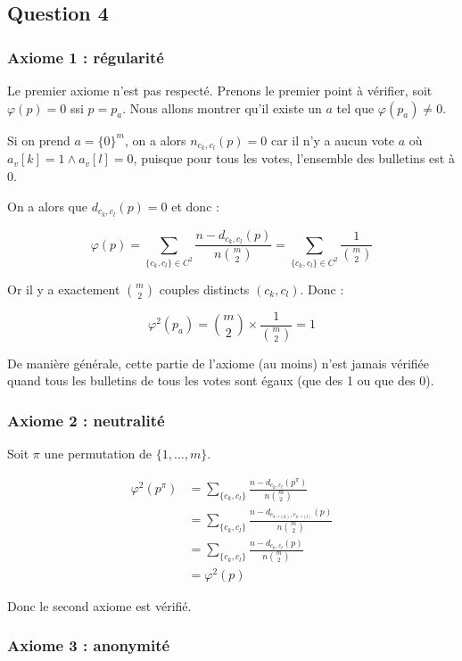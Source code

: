 \documentclass[11pt]{article}
\begin{document}
\subsection{Question 4}
 
\subsubsection{Axiome 1 : régularité}

Le premier axiome n'est pas respecté. Prenons le premier point à vérifier, soit $\varphi(p) = 0$ ssi $p = p_a$. Nous allons montrer qu'il existe un $a$ tel que $\varphi(p_a) \neq 0$.

Si on prend $a = \{0\}^m$, on a alors $n_{c_k,c_l}(p) = 0$ car il n'y a aucun vote $a$ où $a_v[k] = 1 \land a_v[l]=0$, puisque pour tous les votes, l'ensemble des bulletins est à $0$.

On a alors que $d_{c_k,c_l}(p) = 0$ et donc :

\[
\varphi(p) = \sum_{\{c_k,c_l\} \in C^2} 
\frac{n - d_{c_k,c_l}(p)}{n \binom{m}{2}} 
= \sum_{\{c_k,c_l\} \in C^2} \frac{1}{\binom{m}{2}} 
\]

Or il y a exactement $\binom{m}{2}$ couples distincts $({c_k,c_l})$. Donc : 

\[
\varphi^2(p_a) = \binom m2 \times \frac {1}{\binom m2} = 1
\]

De manière générale, cette partie de l'axiome (au moins) n'est jamais vérifiée quand tous les bulletins de tous les votes sont égaux (que des 1 ou que des 0).


\subsubsection{Axiome 2 : neutralité}

Soit $\pi$ une permutation de $\{1, \ldots, m\}$.

\begin{align*}
\varphi^2(p^\pi) 
&= \sum_{\{c_k,c_l\}} 
\frac{n - d_{c_k,c_l}(p^\pi)}{n \binom{m}{2}} \\
&= \sum_{\{c_k,c_l\}}
\frac{n - d_{c_{\pi^{-1}(k)}, c_{\pi^{-1}(l)}}(p)}{n \binom{m}{2}} \\
&= \sum_{\{c_k,c_l\}}
\frac{n - d_{c_k,c_l}(p)}{n \binom{m}{2}} \\
&= \varphi^2(p)
\end{align*}

Donc le second axiome est vérifié.


\subsubsection{Axiome 3 : anonymité}
\end{document}
